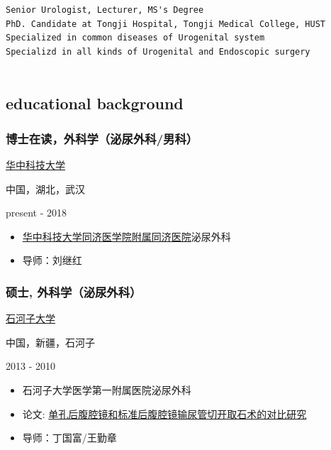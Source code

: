 \documentclass[]{article}
\providecommand{\tightlist}{%
  \setlength{\itemsep}{0pt}\setlength{\parskip}{0pt}}
\begin{document}
\begin{verbatim}
Senior Urologist, Lecturer, MS's Degree
PhD. Candidate at Tongji Hospital, Tongji Medical College, HUST
Specialized in common diseases of Urogenital system
Specializd in all kinds of Urogenital and Endoscopic surgery
   
\end{verbatim}

\hypertarget{educational-background}{%
\subsection{educational background}\label{educational-background}}

\hypertarget{ux535aux58ebux5728ux8bfbux5916ux79d1ux5b66ux6cccux5c3fux5916ux79d1ux7537ux79d1}{%
\subsubsection{博士在读，外科学（泌尿外科/男科）}\label{ux535aux58ebux5728ux8bfbux5916ux79d1ux5b66ux6cccux5c3fux5916ux79d1ux7537ux79d1}}

\href{http://hust.edu.cn}{华中科技大学}

中国，湖北，武汉

present - 2018

\begin{itemize}
\tightlist
\item
  \href{https://www.tjh.com.cn/}{华中科技大学同济医学院附属同济医院}泌尿外科
\item
  导师：刘继红
\end{itemize}

\hypertarget{ux7855ux58eb-ux5916ux79d1ux5b66ux6cccux5c3fux5916ux79d1}{%
\subsubsection{硕士,
外科学（泌尿外科）}\label{ux7855ux58eb-ux5916ux79d1ux5b66ux6cccux5c3fux5916ux79d1}}

\href{http://shzu.edu.cn}{石河子大学}

中国，新疆，石河子

2013 - 2010

\begin{itemize}
\tightlist
\item
  石河子大学医学第一附属医院泌尿外科
\item
  论文:
  \href{https://kns.cnki.net/KCMS/detail/detail.aspx?dbcode=CMFD\&dbname=CMFD201401\&filename=1013366130.nh\&uid=WEEvREcwSlJHSldRa1FhcEFLUmVhaTRHcXdpYWlVT0V2cGJzMGxZT2o2VT0=$9A4hF_YAuvQ5obgVAqNKPCYcEjKensW4IQMovwHtwkF4VYPoHbKxJw!!\&v=MTcxMzVUcldNMUZyQ1VSN3FmWmVSckZ5emxWTDNJVkYyNkhiQytHTkRQcjVFYlBJUjhlWDFMdXhZUzdEaDFUM3E=}{单孔后腹腔镜和标准后腹腔镜输尿管切开取石术的对比研究}
\item
  导师：丁国富/王勤章
\end{itemize}
\end{document}
